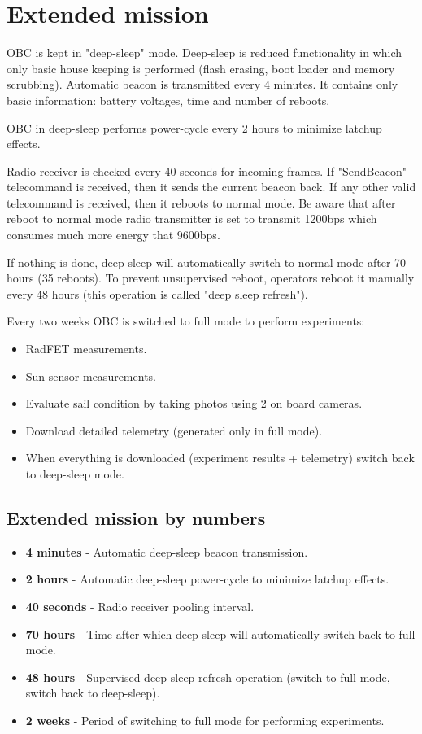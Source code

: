 \section{Extended mission}

OBC is kept in "deep-sleep" mode. Deep-sleep is reduced functionality in which only basic house keeping is performed (flash erasing, boot loader and memory scrubbing). Automatic beacon is transmitted every 4 minutes. It contains only basic information: battery voltages, time and number of reboots.

OBC in deep-sleep performs power-cycle every 2 hours to minimize latchup effects. 
    
Radio receiver is checked every 40 seconds for incoming frames. If "SendBeacon" telecommand is received, then it sends the current beacon back. If any other valid telecommand is received, then it reboots to normal mode. Be aware that after reboot to normal mode radio transmitter is set to transmit 1200bps which consumes much more energy that 9600bps. 

If nothing is done, deep-sleep will automatically switch to normal mode after 70 hours (35 reboots). To prevent unsupervised reboot, operators reboot it manually every 48 hours (this operation is called "deep sleep refresh").
 
Every two weeks OBC is switched to full mode to perform experiments:
\begin{itemize}
    \item RadFET measurements.
    \item Sun sensor measurements.
    \item Evaluate sail condition by taking photos using 2 on board cameras.
    \item Download detailed telemetry (generated only in full mode).
    \item When everything is downloaded (experiment results + telemetry) switch back to deep-sleep mode.
\end{itemize}


\subsection{Extended mission by numbers}

\begin{itemize}
    \item \textbf{4 minutes} - Automatic deep-sleep beacon transmission.
    \item \textbf{2 hours} - Automatic deep-sleep power-cycle to minimize latchup effects.
    \item \textbf{40 seconds} - Radio receiver pooling interval.
    \item \textbf{70 hours} - Time after which deep-sleep will automatically switch back to full mode.
    \item \textbf{48 hours} - Supervised deep-sleep refresh operation (switch to full-mode, switch back to deep-sleep).
    \item \textbf{2 weeks} - Period of switching to full mode for performing experiments.
\end{itemize}

